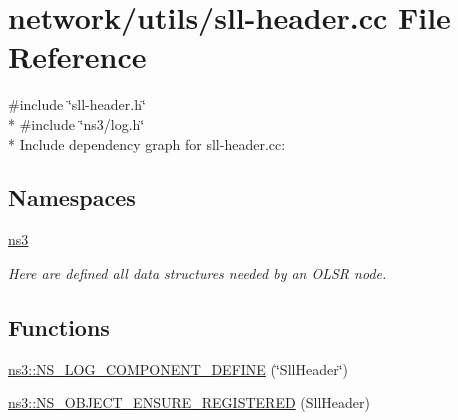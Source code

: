\hypertarget{sll-header_8cc}{}\section{network/utils/sll-\/header.cc File Reference}
\label{sll-header_8cc}
{\ttfamily \#include \char`\"{}sll-\/header.\+h\char`\"{}}\\*
{\ttfamily \#include \char`\"{}ns3/log.\+h\char`\"{}}\\*
Include dependency graph for sll-\/header.cc\+:
\subsection*{Namespaces}
\begin{DoxyCompactItemize}
\item 
 \hyperlink{namespacens3}{ns3}
\begin{DoxyCompactList}\small\item\em Here are defined all data structures needed by an O\+L\+SR node. \end{DoxyCompactList}\end{DoxyCompactItemize}
\subsection*{Functions}
\begin{DoxyCompactItemize}
\item 
\hyperlink{namespacens3_a6b703effbb99c2885a28d04dafb88e9a}{ns3\+::\+N\+S\+\_\+\+L\+O\+G\+\_\+\+C\+O\+M\+P\+O\+N\+E\+N\+T\+\_\+\+D\+E\+F\+I\+NE} (\char`\"{}Sll\+Header\char`\"{})
\item 
\hyperlink{namespacens3_a5d95a0e3eccc736f65ca8c68e7a5f675}{ns3\+::\+N\+S\+\_\+\+O\+B\+J\+E\+C\+T\+\_\+\+E\+N\+S\+U\+R\+E\+\_\+\+R\+E\+G\+I\+S\+T\+E\+R\+ED} (Sll\+Header)
\end{DoxyCompactItemize}
